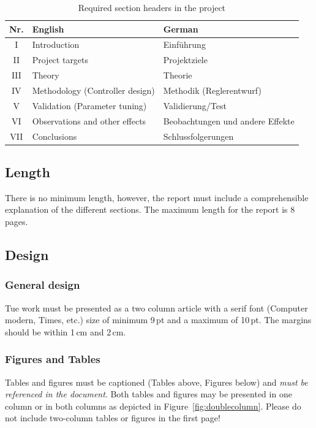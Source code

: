 	\begin{table}[hb]
		\caption{Required section headers in the project}\label{tbl:sections}
		\centering
		\begin{tabular}{cp{12em}p{12em}}
			\hline
			\bfseries Nr. & \bfseries English & \bfseries German\\
			\hline
			I & Introduction & Einführung\\
			II & Project targets & Projektziele \\
			III & Theory & Theorie \\
			IV & Methodology (Controller design) & Methodik (Reglerentwurf)\\
			V & Validation (Parameter tuning) & Validierung/Test \\
			VI & Observations and other effects & Beobachtungen und andere Effekte\\
			VII & Conclusions & Schlussfolgerungen\\
			\hline
		\end{tabular}
	\end{table}
	

	\subsection{Length}
	
	There is no minimum length, however, the report must include a comprehensible explanation of the different sections. The maximum length for the report is 8 pages.


	
	\subsection{Design}
	
	\subsubsection{General design}
	
	Tue work must be presented as a two column article with a serif font (Computer modern, Times, etc.)  size of minimum 9\,pt and a maximum of 10\,pt. The margins should be within 1\,cm and 2\,cm.
	
	\subsubsection{Figures and Tables}
	Tables and figures must be captioned (Tables above, Figures below) and \emph{must be referenced in the document}. Both tables and figures may be presented in one column or in both columns as depicted in Figure~\ref{fig:doublecolumn}. Please do not include two-column tables or figures in the first page!
	

